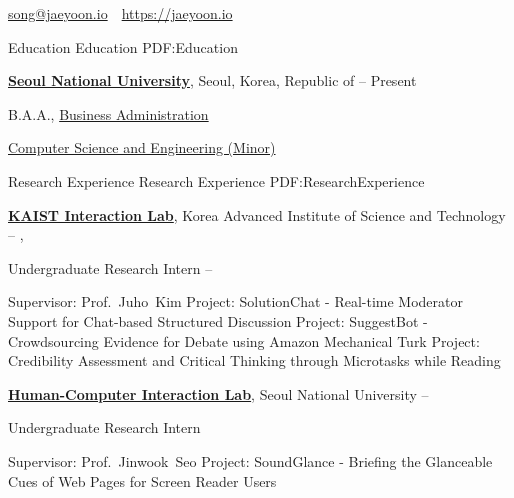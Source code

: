 \documentclass[letterpaper,MMMyyyy,nonstopmode]{template}
\newcommand{\CVAuthor}{Jaeyoon Song}
\newcommand{\CVWebpage}{https://jaeyoon.io}
\begin{document}

\Title{\CVAuthor}

\Gap
\begin{SubTitle}
\href{mailto:song@jaeyoon.io}
{song@jaeyoon.io}
\,\SubBulletSymbol\,
\href{\CVWebpage}
{\url{\CVWebpage}}
\end{SubTitle}

\begin{Body}



\BigGap
\Section
{Education}
{Education}
{PDF:Education}

\Entry
\href{http://www.snu.ac.kr}
{\textbf{Seoul National University}},
Seoul, Korea, Republic of
\hfill
{} --
Present

\Gap
\BulletItem
B.A.A.,
\href{http://cba.snu.ac.kr}
{Business Administration}

\Gap
\BulletItem
\href{http://cse.snu.ac.kr}
{Computer Science and Engineering (Minor)}

\BigGap
\Section
{Research Experience}
{Research Experience}
{PDF:ResearchExperience}

\Entry
\href{https://www.kixlab.org}
{\textbf{KAIST Interaction Lab}},
Korea Advanced Institute of Science and Technology
\hfill
{} -- 
,

\Gap
\BulletItem
Undergraduate Research Intern
\hfill
{} --

\Gap
\begin{Detail}
\SubBulletItem
Supervisor:
Prof.~Juho~Kim
\SubBulletItem
Project:
SolutionChat - Real-time Moderator Support for Chat-based Structured Discussion
\SubBulletItem
Project:
SuggestBot - Crowdsourcing Evidence for Debate using Amazon Mechanical Turk
\SubBulletItem
Project:
Credibility Assessment and Critical Thinking through Microtasks while Reading
\end{Detail}

\BigGap
\Entry
\href{http://hcil.snu.ac.kr/}
{\textbf{Human-Computer Interaction Lab}},
Seoul National University
\hfill
{} --

\Gap
\BulletItem
Undergraduate Research Intern
\begin{Detail}

\SubBulletItem
Supervisor:
Prof.~Jinwook~Seo
\SubBulletItem
Project:
SoundGlance - Briefing the Glanceable Cues of Web Pages for Screen Reader Users


\end{Detail}
\end{Body}
\end{document}
